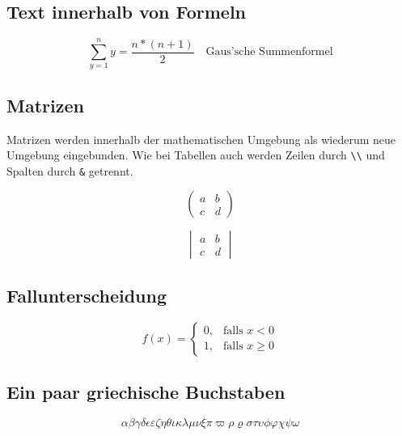 \subsection{Text innerhalb von Formeln}

\begin{equation}
\sum_{y=1}^{n} y = \frac{n*(n+1)}{2}
\quad
\text{Gaus'sche Summenformel}
\end{equation}

\subsection{Matrizen}

Matrizen werden innerhalb der mathematischen Umgebung als wiederum neue Umgebung eingebunden. Wie bei Tabellen auch werden Zeilen durch \lstinline{\\} und Spalten durch \lstinline{&} getrennt.

\begin{equation}
\begin{pmatrix} 
a&b\\
c&d 
\end{pmatrix}
\end{equation} 

\begin{equation}
\begin{vmatrix} 
a&b\\
c&d 
\end{vmatrix}
\end{equation} 

\subsection{Fallunterscheidung}

\begin{equation}
f(x) = 
\begin{cases}
0, &\text{falls } x < 0 \\
1, &\text{falls } x \geq 0
\end{cases}
\end{equation}

\subsection{Ein paar griechische Buchstaben}

\begin{equation}
\alpha\beta\gamma\delta\epsilon\varepsilon\zeta\eta
\theta\iota\kappa\lambda\mu\nu\xi\pi\varpi\rho\varrho
\sigma\tau\upsilon\phi\varphi\chi\psi\omega
\end{equation}